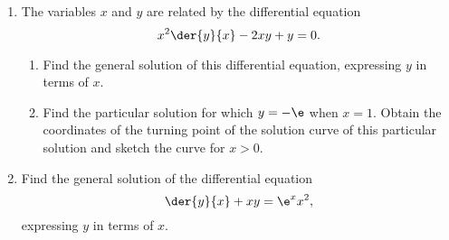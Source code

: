 \begin{problem}
    \begin{enumerate}
        \item The variables $x$ and $y$ are related by the differential equation \[x^2 \der{y}{x} - 2xy + y = 0.\]
        \begin{enumerate}
            \item Find the general solution of this differential equation, expressing $y$ in terms of $x$.
            \item Find the particular solution for which $y = -\e$ when $x = 1$. Obtain the coordinates of the turning point of the solution curve of this particular solution and sketch the curve for $x > 0$.
        \end{enumerate}
        \item Find the general solution of the differential equation \[\der{y}{x} + xy = \e^x x^2,\] expressing $y$ in terms of $x$.
    \end{enumerate}
\end{problem}

